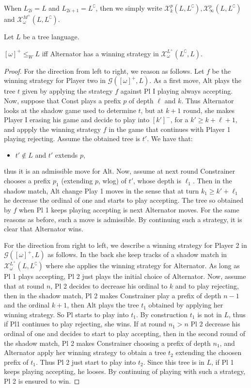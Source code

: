 \documentclass{llncs}
\begin{document}
When $L_{2i}=L$ and $L_{2i +1}=L^\complement$, then we simply write $\mathcal{X}^p_k(L, L^\complement), \mathcal{X}^p_\infty(L, L^\complement)$ and  $\mathcal{X}^{M^+}_\omega(L, L^\complement)$.

\begin{proposition}\label{prop:omega} Let $L$ be a tree language.

$[\omega]^+ \leq_W L$ iff Alternator has a winning strategy in $\mathcal{X}^{L^+}_\omega(L^\complement, L)$. 

\end{proposition}
\begin{proof}
For the direction from left to right, we reason as follows. Let $f$ be the winning strategy for Player two in $\mathcal{G}([\omega]^+, L)$. As a first move, Alt plays the tree $t$ given by applying the strategy $f$ against Pl I playing always accepting. Now, suppose that Const plays a prefix $p$ of depth $\ell$ and $k$. Thus Alternator looks at the shadow game used to determine $t$, but at $k+1$ round, she makes Player I erasing his game and decide to play into $[k']^-$, for a $k' \geq k + \ell +1$, and appply the winning strategy $f$ in the game that continues with Player 1 playing rejecting. Assume the obtained tree is $t'$. We have that:
\begin{itemize}
\item $t' \notin L$ and $t'$ extends $p$,
\end{itemize}
thus it is an admissible move for Alt.
Now, assume at next round Constrainer chooses a prefix $p_1$ (extending $p$, wlog) of $t'$, whose depth is $\ell_1$. Then in the shadow match, Alt change Play 1 moves in the sense that at turn $k_1 \geq k' + \ell_1$ he decrease the ordinal of one and starts to play accepting. The tree so obtained by $f$ when Pl 1 keeps playing accepting is next Alternator moves. For the same reasons as before, such a move is admissible. By continuing such a strategy, it is clear that Alternator wins.

For the direction from right to left, we describe a winning strategy for Player 2 in $\mathcal{G}([\omega]^+, L)$ as follows. In the back she keep tracks of a shadow match in $\mathcal{X}^{L^+}_\omega(L, L^\complement)$ where she applies the  winning strategy for Alternator. 
As long as Pl 1 plays accepting, Pl 2 just plays the initial choice of Alternator. Now, assume that at round $n$, Pl 2 decides to decrease his ordinal to $k$ and to play rejecting, then in the shadow match, Pl 2 makes Constrainer play a prefix of depth $n-1$ and the ordinal $k+1$, then Alt plays the tree $t_1$ obtained by applying her winning strategy. So Pl starts to play into $t_1$. By construction $t_1$ is not in $L$, thus if Pl1 continues to play rejecting, she wins. If at round $n_1> n$ Pl 2 decrease his ordinal of one and decides to start to play accepting, then in the second round of the shadow match, Pl 2 makes Constrainer choosing a prefix of depth $n_1$, and Alternator apply her winning strategy to obtain a tree $t_2$ extending the choosen prefix of $t_1$. Thus Pl 2 just start to play into $t_2$. Since this tree is in $L$, if Pl 1 keeps playing accepting, he looses. By continuing of playing with such a strategy, Pl 2 is ensured to win. 
\end{proof}
\end{document}
